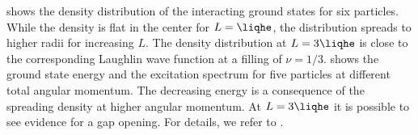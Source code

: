  shows the density distribution of the interacting ground states for six particles. While the density is flat in the center for $L=\liqhe$, the distribution spreads to higher radii for increasing $L$. The density distribution at $L=3\liqhe$ is close to the corresponding Laughlin wave function at a filling of $\nu=1/3$.  shows the ground state energy and the excitation spectrum for five particles at different total angular momentum. The decreasing energy is a consequence of the spreading density at higher angular momentum. At $L=3\liqhe$ it is possible to see evidence for a gap opening. For details, we refer to .
